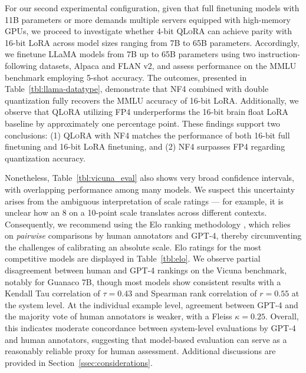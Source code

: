 For our second experimental configuration, given that full finetuning models with 11B parameters or more demands multiple servers equipped with high-memory GPUs, we proceed to investigate whether 4-bit \textsc{QLoRA} can achieve parity with 16-bit LoRA across model sizes ranging from 7B to 65B parameters. Accordingly, we finetune LLaMA models from 7B up to 65B parameters using two instruction-following datasets, Alpaca and FLAN v2, and assess performance on the MMLU benchmark employing 5-shot accuracy. The outcomes, presented in Table~\ref{tbl:llama-datatype}, demonstrate that NF4 combined with double quantization fully recovers the MMLU accuracy of 16-bit LoRA. Additionally, we observe that \textsc{QLoRA} utilizing FP4 underperforms the 16-bit brain float LoRA baseline by approximately one percentage point. These findings support two conclusions: (1) \textsc{QLoRA} with NF4 matches the performance of both 16-bit full finetuning and 16-bit LoRA finetuning, and (2) NF4 surpasses FP4 regarding quantization accuracy.

Nonetheless, Table~\ref{tbl:vicuna_eval} also shows very broad confidence intervals, with overlapping performance among many models. We suspect this uncertainty arises from the ambiguous interpretation of scale ratings — for example, it is unclear how an 8 on a 10-point scale translates across different contexts. Consequently, we recommend using the Elo ranking methodology \citep{elo1967proposed}, which relies on \textit{pairwise} comparisons by human annotators and GPT-4, thereby circumventing the challenges of calibrating an absolute scale. Elo ratings for the most competitive models are displayed in Table~\ref{tbl:elo}. We observe partial disagreement between human and GPT-4 rankings on the Vicuna benchmark, notably for Guanaco 7B, though most models show consistent results with a Kendall Tau correlation of $\tau=0.43$ and Spearman rank correlation of $r=0.55$ at the system level. At the individual example level, agreement between GPT-4 and the majority vote of human annotators is weaker, with a Fleiss $\kappa=0.25$. Overall, this indicates moderate concordance between system-level evaluations by GPT-4 and human annotators, suggesting that model-based evaluation can serve as a reasonably reliable proxy for human assessment. Additional discussions are provided in Section~\ref{ssec:considerations}.

